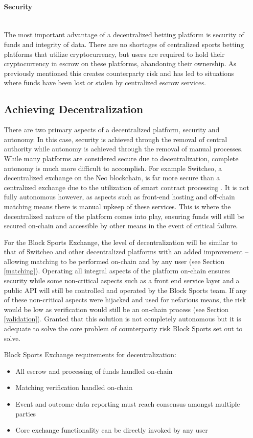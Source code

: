 \documentclass{article}
\newcommand{\myparagraph}[1]{\paragraph{#1}\mbox{}\\ \newline}
\begin{document}
				\myparagraph{Security} \label{security}
The most important advantage of a decentralized betting platform is security of funds and integrity of data. There are no shortages of centralized sports betting platforms that utilize cryptocurrency, but users are required to hold their cryptocurrency in escrow on these platforms, abandoning their ownership. As previously mentioned this creates counterparty risk and has led to situations where funds have been lost or stolen by centralized escrow services.

	\clearpage
	\subsection{Achieving Decentralization} \label{achieving-decentralization}
There are two primary aspects of a decentralized platform, security and autonomy. In this case, security is achieved through the removal of central authority while autonomy is achieved through the removal of manual processes. While many platforms are considered secure due to decentralization, complete autonomy is much more difficult to accomplish. For example Switcheo, a decentralized exchange on the Neo blockchain, is far more secure than a centralized exchange due to the utilization of smart contract processing \cite{switcheo}. It is not fully autonomous however, as aspects such as front-end hosting and off-chain matching means there is manual upkeep of these services. This is where the decentralized nature of the platform comes into play, ensuring funds will still be secured on-chain and accessible by other means in the event of critical failure.

For the Block Sports Exchange, the level of decentralization will be similar to that of Switcheo and other decentralized platforms with an added improvement -- allowing matching to be performed on-chain and by any user (see Section \ref{matching}). Operating all integral aspects of the platform on-chain ensures security while some non-critical aspects such as a front end service layer and a public API will still be controlled and operated by the Block Sports team. If any of these non-critical aspects were hijacked and used for nefarious means, the risk would be low as verification would still be an on-chain process (see Section \ref{validation}). Granted that this solution is not completely autonomous but it is adequate to solve the core problem of counterparty risk Block Sports set out to solve.

Block Sports Exchange requirements for decentralization:
\begin{itemize}
	\item All escrow and processing of funds handled on-chain
	\item Matching verification handled on-chain
	\item Event and outcome data reporting must reach consensus amongst multiple parties 
	\item Core exchange functionality can be directly invoked by any user
\end{itemize}
\end{document}
